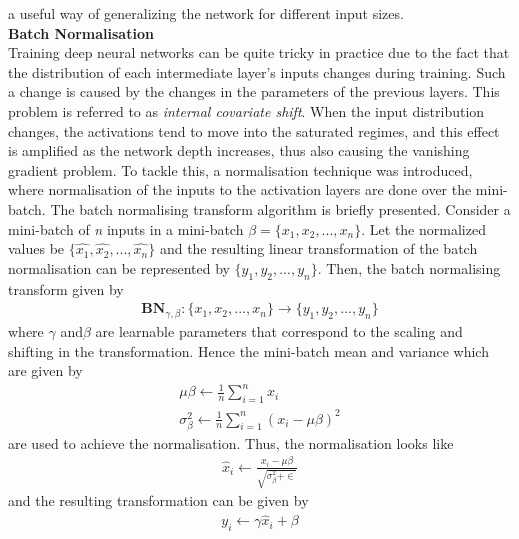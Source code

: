 \begin{enumerate}
                    a useful way of generalizing the network for different input sizes. \\ 
                    \vspace{3mm} 
                    \textbf{Batch Normalisation} \\ 
                    \vspace{3mm}
                    Training deep neural networks can be quite tricky in practice due to the fact that
                    the distribution of each intermediate layer’s inputs changes during training. Such a
                    change is caused by the changes in the parameters of the previous layers. This problem is referred to as \emph{internal covariate shift}. When the input distribution changes,
                    the activations tend to move into the saturated regimes, and this effect is amplified
                    as the network depth increases, thus also causing the vanishing gradient problem.
                    To tackle this, a normalisation technique was introduced, where normalisation of the inputs to the activation layers are done over the mini-batch. The batch
                    normalising transform algorithm is briefly presented. Consider a mini-batch of \emph{n} inputs in a mini-batch \textbf{$\beta = \{x_1,x_2,...,x_n\}$}. Let 
                    the normalized values be $\{\hat{x_1},\hat{x_2},...,\hat{x_n}\}$ and the resulting linear transformation of the batch 
                    normalisation can be represented by $\{y_1,y_2,...,y_n\}$. Then, the batch normalising transform given by 
                    \begin{align}
                        \textbf{BN}_{\gamma,\beta} : \{x_1,x_2,...,x_n\} \rightarrow \{y_1,y_2,...,y_n\}
                    \end{align}
                    where $\gamma$ and$\beta$ are learnable parameters that correspond to the scaling and shifting
                    in the transformation. Hence the mini-batch mean and variance which are given by 
                    \begin{align}
                        \mu \beta \leftarrow \frac{1}{n} \displaystyle\sum_{i=1}^n x_i \\
                        \sigma_\beta^2 \leftarrow \frac{1}{n} \displaystyle\sum_{i=1}^n (x_i - \mu \beta)^2
                    \end{align}
                    are used to achieve the normalisation. Thus, the normalisation looks like
                    \begin{align}
                        \hat{x}_i \leftarrow \frac{x_i - \mu \beta}{\sqrt{\sigma_\beta^2 + \in}}
                    \end{align}
                    and the resulting transformation can be given by
                    \begin{align}
                        y_i \leftarrow \gamma \hat{x}_i + \beta
                    \end{align}
            \end{enumerate}
